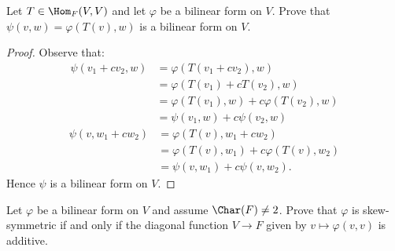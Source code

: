 \documentclass[11pt,twoside,openany]{memoir}
\begin{document}
    \begin{exercise}
        Let $T \in \Hom_F(V,V)$ and let $\varphi$ be a bilinear form on $V$. Prove that $\psi(v,w) = \varphi(T(v),w)$ is a bilinear form on $V$.
    \end{exercise}
        \begin{proof}
            Observe that:
                \begin{equation*}
                \begin{split}
                    \psi(v_1 + cv_2,w)
                    & = \varphi(T(v_1 + cv_2),w) \\
                    & = \varphi(T(v_1) + cT(v_2),w) \\
                    & = \varphi(T(v_1),w) + c\varphi(T(v_2),w) \\
                    & = \psi(v_1,w) + c\psi(v_2,w)
                \end{split}
                \end{equation*}
                \begin{equation*}
                \begin{split}
                    \psi(v,w_1 + cw_2)
                    & = \varphi(T(v),w_1 + cw_2) \\
                    & = \varphi(T(v),w_1) + c\varphi(T(v),w_2) \\
                    & = \psi(v,w_1) + c\psi(v,w_2). 
                \end{split}
                \end{equation*}
            Hence $\psi$ is a bilinear form on $V$.
        \end{proof}
    \begin{exercise}
        Let $\varphi$ be a bilinear form on $V$ and assume $\Char(F) \neq 2$. Prove that $\varphi$ is skew-symmetric if and only if the diagonal function $V \rightarrow F$ given by $v \mapsto \varphi(v,v)$ is additive.
    \end{exercise}
\end{document}
